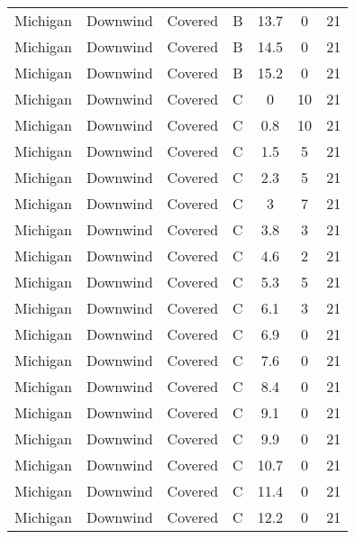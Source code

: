 \documentclass{article}
\begin{document}
\begin{longtable}[c]{ccccccc}
Michigan  & Downwind  & Covered     & B               & 13.7         & 0           & 21  \\
Michigan  & Downwind  & Covered     & B               & 14.5         & 0           & 21  \\
Michigan  & Downwind  & Covered     & B               & 15.2         & 0           & 21  \\
Michigan  & Downwind  & Covered     & C               & 0            & 10          & 21  \\
Michigan  & Downwind  & Covered     & C               & 0.8          & 10          & 21  \\
Michigan  & Downwind  & Covered     & C               & 1.5          & 5           & 21  \\
Michigan  & Downwind  & Covered     & C               & 2.3          & 5           & 21  \\
Michigan  & Downwind  & Covered     & C               & 3            & 7           & 21  \\
Michigan  & Downwind  & Covered     & C               & 3.8          & 3           & 21  \\
Michigan  & Downwind  & Covered     & C               & 4.6          & 2           & 21  \\
Michigan  & Downwind  & Covered     & C               & 5.3          & 5           & 21  \\
Michigan  & Downwind  & Covered     & C               & 6.1          & 3           & 21  \\
Michigan  & Downwind  & Covered     & C               & 6.9          & 0           & 21  \\
Michigan  & Downwind  & Covered     & C               & 7.6          & 0           & 21  \\
Michigan  & Downwind  & Covered     & C               & 8.4          & 0           & 21  \\
Michigan  & Downwind  & Covered     & C               & 9.1          & 0           & 21  \\
Michigan  & Downwind  & Covered     & C               & 9.9          & 0           & 21  \\
Michigan  & Downwind  & Covered     & C               & 10.7         & 0           & 21  \\
Michigan  & Downwind  & Covered     & C               & 11.4         & 0           & 21  \\
Michigan  & Downwind  & Covered     & C               & 12.2         & 0           & 21  \\

\end{longtable}
\end{document}
